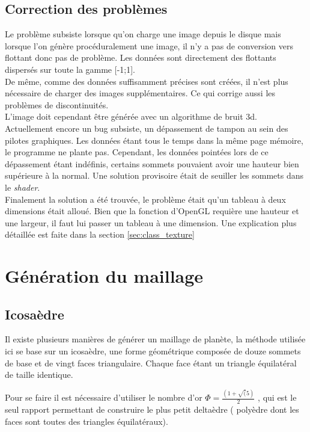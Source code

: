     \subsection{Correction des problèmes}
    Le problème subsiste lorsque qu'on charge une image depuis le disque mais lorsque l'on génère procéduralement une image,
    il n'y a pas de conversion vers flottant donc pas de problème. Les données sont directement des flottants dispersés sur toute la gamme [-1;1].\\
    De même, comme des données suffisamment précises sont créées, il n'est plus nécessaire de charger des images supplémentaires. Ce qui corrige aussi les problèmes de discontinuités.\\
    L'image doit cependant être générée avec un algorithme de bruit 3d.\\
    
    
    Actuellement encore un bug subsiste, un dépassement de tampon au sein des pilotes graphiques. 
    Les données étant tous le temps dans
    la même page mémoire, le programme ne plante pas. Cependant, les données pointées lors de ce dépassement étant indéfinis, certains sommets pouvaient avoir une hauteur bien supérieure à la normal. Une solution provisoire était de seuiller les sommets dans le \textit{shader}.\\
    Finalement la solution a été trouvée, le problème était qu'un tableau à deux dimensions était alloué.
    Bien que la fonction d'OpenGL requière une hauteur et une largeur, il faut lui passer un tableau à une dimension. Une explication plus détaillée est faite dans la section \ref{sec:class_texture}
    
   \section{Génération du maillage}	%
	\subsection{Icosaèdre}
	\label{subsec:icosaèdre}
	
	Il existe plusieurs manières de générer un maillage de planète, la méthode utilisée ici
	se base sur un icosaèdre, une forme géométrique composée de douze sommets de base et 
	de vingt faces triangulaire. Chaque face étant un triangle équilatéral de taille identique.
	
	Pour se faire il est nécessaire d'utiliser le nombre d'or $\Phi = \frac{(1+\sqrt(5)}{2}$ , qui est le seul rapport permettant de construire le plus petit deltaèdre ( polyèdre dont les faces sont toutes des triangles équilatéraux).
	
